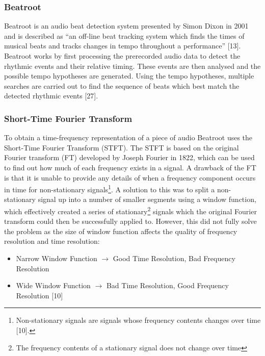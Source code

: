 \documentclass[a4paper, 11pt]{article}
\begin{document}
\subsubsection{Beatroot}
Beatroot is an audio beat detection system presented by Simon Dixon in 2001 and is described as ``an off-line beat tracking system which finds the times of musical beats and tracks changes in tempo throughout a performance'' [13]. Beatroot works by first processing the prerecorded audio data to detect the rhythmic events and their relative timing. These events are then analysed and the possible tempo hypotheses are generated. Using the tempo hypotheses, multiple searches are carried out to find the sequence of beats which best match the detected rhythmic events [27]. 



\subsubsection{Short-Time Fourier Transform}
To obtain a time-frequency representation of a piece of audio Beatroot uses the Short-Time Fourier Transform (STFT). The STFT is based on the original Fourier transform (FT) developed by Joseph Fourier in 1822, which can be used to find out how much of each frequency exists in a signal. A drawback of the FT is that it is unable to provide any details of when a frequency component occurs in time for non-stationary signals\footnote{Non-stationary signals are signals whose frequency contents changes over time [10].}. A solution to this was to split a non-stationary signal up into a number of smaller segments using a window function, which effectively created a series of stationary\footnote{The frequency contents of a stationary signal does not change over time} signals which the original Fourier transform could then be successfully applied to. However, this did not fully solve the problem as the size of window function affects the quality of frequency resolution and time resolution:
\begin{itemize}
\item Narrow Window Function $\longrightarrow$  Good Time Resolution, Bad Frequency Resolution
\item Wide Window Function $\longrightarrow$  Bad Time Resolution, Good Frequency Resolution [10]
\end{itemize}
\end{document}
